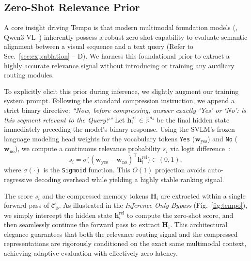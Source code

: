 \subsection{Zero-Shot Relevance Prior}
\label{sec:method:relevance}

A core insight driving Tempo is that modern multimodal foundation models (\eg, Qwen3-VL~\cite{bai2025qwen3}) inherently possess a robust zero-shot capability to evaluate semantic alignment between a visual sequence and a text query (Refer to Sec.~\ref{sec:exp:ablation} -- D). We harness this foundational prior to extract a highly accurate relevance signal without introducing or training any auxiliary routing modules.

To explicitly elicit this prior during inference, we slightly augment our training system prompt. Following the standard compression instruction, we append a strict binary directive: \emph{``Now, before compressing, answer exactly `Yes' or `No': is this segment relevant to the Query?''} Let $\mathbf{h}_i^{\mathrm{rel}} \in \mathbb{R}^{d_s}$ be the final hidden state immediately preceding the model's binary response. Using the SVLM's frozen language modeling head weights for the vocabulary tokens \texttt{Yes} ($\mathbf{w}_{\mathrm{yes}}$) and \texttt{No} ($\mathbf{w}_{\mathrm{no}}$), we compute a continuous relevance probability $s_i$ via logit difference~\cite{li2026qwen3}:
%
\begin{equation}
s_i = \sigma\Big( (\mathbf{w}_{\mathrm{yes}}-\mathbf{w}_{\mathrm{no}})^\top \mathbf{h}_i^{\mathrm{rel}} \Big) \in (0,1),
\label{eq:relevance}
\end{equation}
%
where $\sigma(\cdot)$ is the \texttt{Sigmoid} function. This $O(1)$ projection avoids auto-regressive decoding overhead while yielding a highly stable ranking signal.

The score $s_i$ and the compressed memory tokens $\mathbf{H}_i$ are extracted within a single forward pass of $\mathcal{C}_\phi$. As illustrated in the \emph{Inference-Only Bypass} (Fig.~\ref{fig:tempo}), we simply intercept the hidden state $\mathbf{h}_i^{\mathrm{rel}}$ to compute the zero-shot score, and then seamlessly continue the forward pass to extract $\mathbf{H}_i$. This architectural elegance guarantees that both the relevance routing signal and the compressed representations are rigorously conditioned on the exact same multimodal context, achieving adaptive evaluation with effectively zero latency.

